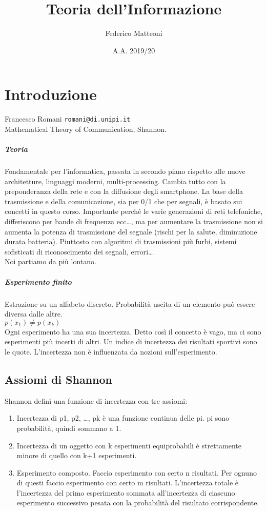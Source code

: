 \documentclass[10pt]{book}
\begin{document}
\renewcommand*\contentsname{Indice}
\title{Teoria dell'Informazione}
\author{Federico Matteoni}
\date{A.A. 2019/20}
\maketitle
\tableofcontents
\pagebreak
\chapter{Introduzione}
Francesco Romani \texttt{romani@di.unipi.it}\\
Mathematical Theory of Communication, Shannon.
\paragraph{Teoria} Fondamentale per l'informatica, passata in secondo piano rispetto alle nuove architetture, linguaggi moderni, multi-processing. Cambia tutto con la preponderanza della rete e con la diffusione degli smartphone. La base della trasmissione e della comunicazione, sia per 0/1 che per segnali, è basato sui concetti in questo corso. Importante perché le varie generazioni di reti telefoniche, differiscono per bande di frequenza ecc\ldots, ma per aumentare la trasmissione non si aumenta la potenza di trasmissione del segnale (rischi per la salute, diminuzione durata batteria). Piuttosto con algoritmi di trasmissioni più furbi, sistemi sofisticati di riconoscimento dei segnali, errori\ldots.\\
Noi partiamo da più lontano.

\paragraph{Esperimento finito} Estrazione su un alfabeto discreto. Probabilità uscita di un elemento può essere diversa dalle altre.\\
$p(x_1) \neq p(x_k)$\\
Ogni esperimento ha una sua incertezza. Detto così il concetto è vago, ma ci sono esperimenti più incerti di altri. Un indice di incertezza dei risultati sportivi sono le quote. L'incertezza non è influenzata da nozioni sull'esperimento.
\section{Assiomi di Shannon}
Shannon definì una funzione di incertezza con tre assiomi:
\begin{enumerate}
	\item Incertezza di p1, p2, \ldots, pk è una funzione continua delle pi. pi sono probabilità, quindi sommano a 1.
	\item Incertezza di un oggetto con k esperimenti equiprobabili è strettamente minore di quello con k+1 esperimenti.
	\item Esperimento composto. Faccio esperimento con certo n risultati. Per ognuno di questi faccio esperimento con certo m risultati. L'incertezza totale è l'incertezza del primo esperimento sommata all'incertezza di ciascuno esperimento successivo pesata con la probabilità del risultato corrispondente.
\end{enumerate}
\end{document}
